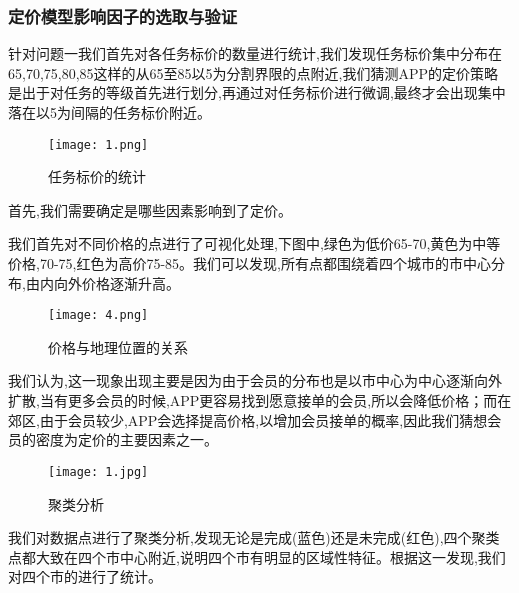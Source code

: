 \documentclass{cumcmthesis}
\begin{document}
\subsubsection{定价模型影响因子的选取与验证}
针对问题一我们首先对各任务标价的数量进行统计,我们发现任务标价集中分布在65,70,75,80,85这样的从65至85以5为分割界限的点附近,我们猜测APP的定价策略是出于对任务的等级首先进行划分,再通过对任务标价进行微调,最终才会出现集中落在以5为间隔的任务标价附近。
\begin{figure}[!h]
	\centering
	\texttt{[image: 1.png]}
	\caption{任务标价的统计}
\end{figure}

首先,我们需要确定是哪些因素影响到了定价。

我们首先对不同价格的点进行了可视化处理,下图中,绿色为低价65-70,黄色为中等价格,70-75,红色为高价75-85。我们可以发现,所有点都围绕着四个城市的市中心分布,由内向外价格逐渐升高。

\begin{figure}[!h]
	\centering
	\texttt{[image: 4.png]}
	\caption{价格与地理位置的关系}
\end{figure}


我们认为,这一现象出现主要是因为由于会员的分布也是以市中心为中心逐渐向外扩散,当有更多会员的时候,APP更容易找到愿意接单的会员,所以会降低价格；而在郊区,由于会员较少,APP会选择提高价格,以增加会员接单的概率,因此我们猜想会员的密度为定价的主要因素之一。

\begin{figure}[!h]
	\centering
	\texttt{[image: 1.jpg]}
	\caption{聚类分析}
\end{figure}


我们对数据点进行了聚类分析,发现无论是完成(蓝色)还是未完成(红色),四个聚类点都大致在四个市中心附近,说明四个市有明显的区域性特征。根据这一发现,我们对四个市的进行了统计。
\end{document}

